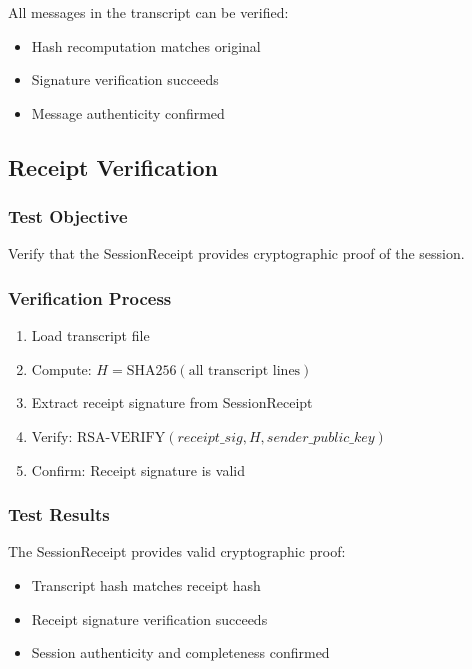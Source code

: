 \documentclass[runningheads]{llncs}
\begin{document}
All messages in the transcript can be verified:
\begin{itemize}
    \item Hash recomputation matches original
    \item Signature verification succeeds
    \item Message authenticity confirmed
\end{itemize}

\subsection{Receipt Verification}

\subsubsection{Test Objective}

Verify that the SessionReceipt provides cryptographic proof of the session.

\subsubsection{Verification Process}

\begin{enumerate}
    \item Load transcript file
    \item Compute: $H = \text{SHA256}(\text{all transcript lines})$
    \item Extract receipt signature from SessionReceipt
    \item Verify: $\text{RSA-VERIFY}(receipt\_sig, H, sender\_public\_key)$
    \item Confirm: Receipt signature is valid
\end{enumerate}

\subsubsection{Test Results}

The SessionReceipt provides valid cryptographic proof:
\begin{itemize}
    \item Transcript hash matches receipt hash
    \item Receipt signature verification succeeds
    \item Session authenticity and completeness confirmed
\end{itemize}
\end{document}
